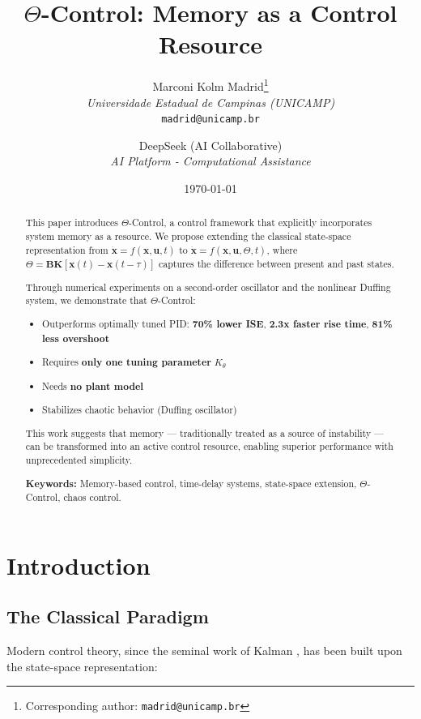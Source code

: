 \documentclass[12pt,a4paper]{article}
\title{$\Theta$-Control: Memory as a Control Resource}
\author{Marconi Kolm Madrid\thanks{Corresponding author: \texttt{madrid@unicamp.br}} \\
        \textit{Universidade Estadual de Campinas (UNICAMP)} \\
        \texttt{madrid@unicamp.br}
        \and
        DeepSeek (AI Collaborative)\\
        \textit{AI Platform - Computational Assistance}
        }
\date{\today}
\begin{document}
\maketitle

\begin{abstract}
This paper introduces $\Theta$-Control, a control framework that 
explicitly incorporates system memory as a resource. We propose 
extending the classical state-space representation from 
$\dot{\mathbf{x}} = f(\mathbf{x},\mathbf{u},t)$ to 
$\dot{\mathbf{x}} = f(\mathbf{x},\mathbf{u},\Theta,t)$, where 
$\Theta = \mathbf{BK}[\mathbf{x}(t) - \mathbf{x}(t-\tau)]$ captures 
the difference between present and past states.

Through numerical experiments on a second-order oscillator and the 
nonlinear Duffing system, we demonstrate that $\Theta$-Control:

\begin{itemize}
    \item Outperforms optimally tuned PID: \textbf{70\% lower ISE}, 
          \textbf{2.3x faster rise time}, \textbf{81\% less overshoot}
    \item Requires \textbf{only one tuning parameter} $K_\theta$
    \item Needs \textbf{no plant model}
    \item Stabilizes chaotic behavior (Duffing oscillator)
\end{itemize}

This work suggests that memory — traditionally treated as a 
source of instability — can be transformed into an active 
control resource, enabling superior performance with 
unprecedented simplicity.

\noindent\textbf{Keywords:} Memory-based control, time-delay 
systems, state-space extension, $\Theta$-Control, chaos control.
\end{abstract}

\section{Introduction}

\subsection{The Classical Paradigm}

Modern control theory, since the seminal work of Kalman 
\cite{kalman1960}, has been built upon the state-space 
representation:
\end{document}

